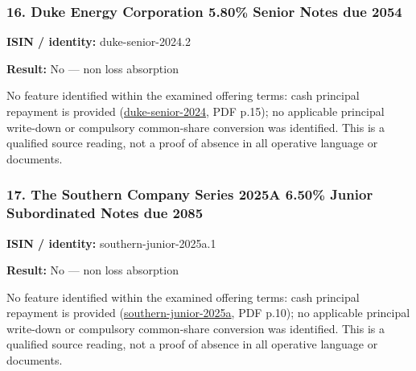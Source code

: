 \documentclass[
  11pt,
]{article}
\begin{document}
\begin{minipage}{\linewidth}

\hypertarget{duke-energy-corporation-5.80-senior-notes-due-2054}{%
\subsubsection{16. Duke Energy Corporation 5.80\% Senior Notes due
2054}\label{duke-energy-corporation-5.80-senior-notes-due-2054}}

\textbf{ISIN / identity:} duke-senior-2024.2

\textbf{Result:} No --- non loss absorption

No feature identified within the examined offering terms: cash principal
repayment is provided
(\href{https://d18rn0p25nwr6d.cloudfront.net/CIK-0001326160/21faa7ae-4c58-40e0-9928-d7e573d1d2f5.pdf}{duke-senior-2024},
PDF p.15); no applicable principal write-down or compulsory common-share
conversion was identified. This is a qualified source reading, not a
proof of absence in all operative language or documents.

\end{minipage}
\par\addvspace{1.1em}

\begin{minipage}{\linewidth}

\hypertarget{the-southern-company-series-2025a-6.50-junior-subordinated-notes-due-2085}{%
\subsubsection{17. The Southern Company Series 2025A 6.50\% Junior
Subordinated Notes due
2085}\label{the-southern-company-series-2025a-6.50-junior-subordinated-notes-due-2085}}

\textbf{ISIN / identity:} southern-junior-2025a.1

\textbf{Result:} No --- non loss absorption

No feature identified within the examined offering terms: cash principal
repayment is provided
(\href{https://d18rn0p25nwr6d.cloudfront.net/CIK-0000092122/2ae8f159-818e-4e94-a3e5-1714a0375503.pdf}{southern-junior-2025a},
PDF p.10); no applicable principal write-down or compulsory common-share
conversion was identified. This is a qualified source reading, not a
proof of absence in all operative language or documents.

\end{minipage}
\par\addvspace{1.1em}
\end{document}
